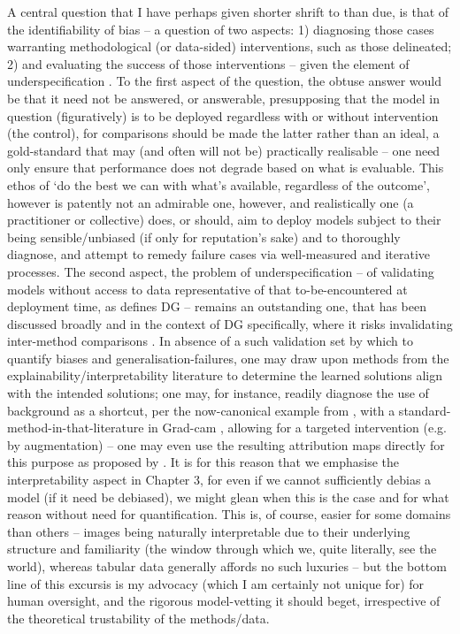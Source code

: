 %
A central question that I have perhaps given shorter shrift to than due, is that of the
identifiability of bias -- a question of two aspects: 1) diagnosing those cases warranting
methodological (or data-sided) interventions, such as those delineated; 2) and evaluating the
success of those interventions -- given the element of underspecification
\citep{semenova2019study}.
%
To the first aspect of the question, the obtuse answer would be that it need not be answered, or
answerable, presupposing that the model in question (figuratively) is to be deployed regardless
with or without intervention (the control), for comparisons should be made \wrt{} the latter rather
than \wrt{} an ideal, a gold-standard that may (and often will not be) practically realisable --
one need only ensure that performance does not degrade based on what is evaluable.
%
%
This ethos of `do the best we can with what's available, regardless of the outcome', however is
patently not an admirable one, however, and realistically one (a practitioner or collective) does,
or should, aim to deploy models subject to their being sensible/unbiased (if only for reputation's
sake) and to thoroughly diagnose, and attempt to remedy failure cases via well-measured and
iterative processes.
%
The second aspect, the problem of underspecification -- of validating models without access to data
representative of that to-be-encountered at deployment time, as defines DG -- remains an
outstanding one, that has been discussed broadly and in the context of DG specifically, where it
risks invalidating inter-method comparisons \citep{gulrajani2020search}.
%
%
In absence of a such validation set by which to quantify biases and generalisation-failures, one
may draw upon methods from the explainability/interpretability literature \citep{gunning2019xai} to
determine the learned solutions align with the intended solutions; one may, for instance, readily
diagnose the use of background as a shortcut, per the now-canonical example from
\cite{beery2018recognition}, with a standard-method-in-that-literature in Grad-cam
\cite{selvaraju2017grad}, allowing for a targeted intervention (e.g. by augmentation) -- one may
even use the resulting attribution maps directly for this purpose as proposed by
\cite{taghanaki2022masktune}.
%
It is for this reason that we emphasise the interpretability aspect in Chapter 3, for even if we
cannot sufficiently debias a model (if it need be debiased), we might glean when this is the case
and for what reason without need for quantification.
%
This is, of course, easier for some domains than others -- images being naturally interpretable due
to their underlying structure and familiarity (the window through which we, quite literally, see
the world), whereas tabular data generally affords no such luxuries -- but the bottom line of this
excursis is my advocacy (which I am certainly not unique for) for human oversight, and the rigorous
model-vetting it should beget, irrespective of the theoretical trustability of the methods/data.
 
